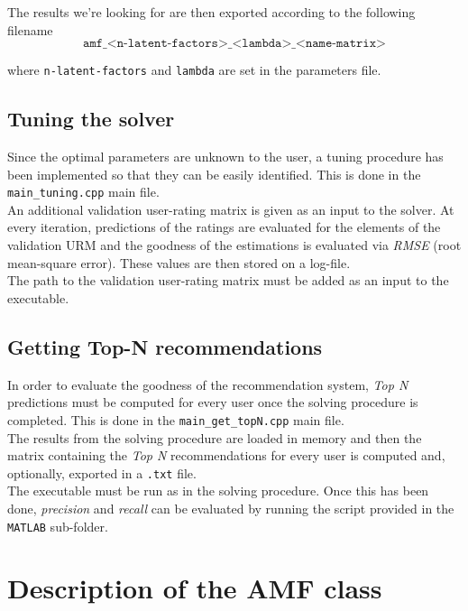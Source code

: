 \documentclass[paper=a4, fontsize=12pt]{scrartcl} %
\numberwithin{equation}{section} %
\numberwithin{figure}{section} %
\numberwithin{table}{section} %
\begin{document}
The results we're looking for are then exported according to the following filename  
\begin{equation*}
\texttt{amf\_<n-latent-factors>\_<lambda>\_<name-matrix>}
\end{equation*} 

where \texttt{n-latent-factors} and \texttt{lambda} are set in the parameters file.

\subsection{Tuning the solver} 
Since the optimal parameters are unknown to the user, a tuning procedure has been implemented so that they can be easily identified. This is done in the \texttt{main\_tuning.cpp} main file.\\

An additional validation user-rating matrix is given as an input to the solver. At every iteration, predictions of the ratings are evaluated for the elements of the validation URM and the goodness of the estimations is evaluated via \emph{RMSE} (root mean-square error). These values are then stored on a log-file. \\ 

The path to the validation user-rating matrix must be added as an input to the executable.

\subsection{Getting Top-N recommendations}

In order to evaluate the goodness of the recommendation system, \emph{Top N} predictions must be computed for every user once the solving procedure is completed. This is done in the \texttt{main\_get\_topN.cpp} main file. \\

The results from the solving procedure are loaded in memory and then the matrix containing the \emph{Top N} recommendations for every user is computed and, optionally, exported in a \texttt{.txt} file. \\

The executable must be run as in the solving procedure. Once this has been done, \emph{precision} and \emph{recall} can be evaluated by running the script provided in the \texttt{MATLAB} sub-folder.  

\section{Description of the AMF class}
\end{document}
